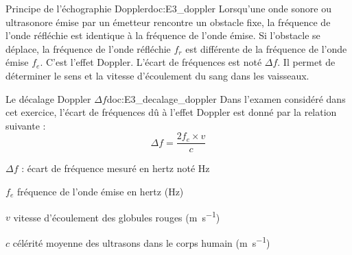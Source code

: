 \begin{doc}{Principe de l'échographie Doppler}{doc:E3_doppler}
  Lorsqu'une onde sonore ou ultrasonore émise par un émetteur rencontre un obstacle fixe, la fréquence de l'onde réfléchie est identique à la fréquence de l'onde émise.
  Si l'obstacle se déplace, la fréquence de l'onde réfléchie $f_r$ est différente de la fréquence de l'onde émise $f_e$.
  C'est l'effet Doppler.
  L'écart de fréquences est noté $\Delta f$.
  Il permet de déterminer le sens et la vitesse d'écoulement du sang dans les vaisseaux.
\end{doc}

\begin{doc}{Le décalage Doppler $\Delta f$}{doc:E3_decalage_doppler}
  Dans l'examen considéré dans cet exercice, l'écart de fréquences dû à l'effet Doppler est donné par la relation suivante :
  \begin{equation*}
    \Delta f = \dfrac{2f_e \times v}{c}
  \end{equation*}
  \begin{listePoints}
    \item $\Delta f$ : écart de fréquence mesuré en hertz noté \unit{\hertz}
    \item $f_e$ fréquence de l'onde émise en hertz (\unit{\hertz})
    \item $v$ vitesse d'écoulement des globules rouges (\unit{\m\per\s})
    \item $c$ célérité moyenne des ultrasons dans le corps humain (\unit{\m\per\s})
  \end{listePoints}
\end{doc}





